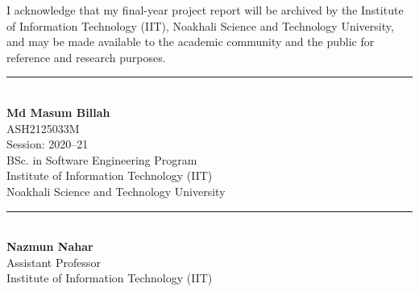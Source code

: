 I acknowledge that my final-year project report will be archived by the Institute of Information Technology (IIT), Noakhali Science and Technology University, and may be made available to the academic community and the public for reference and research purposes.
	
\vfil

\noindent
\begin{minipage}[t]{0.50\textwidth}
	\centering
	\rule{6cm}{0.4pt}\\[0.15cm]
	\textbf{Md Masum Billah}\\
	ASH2125033M\\
	Session: 2020--21\\
	BSc. in Software Engineering Program\\
	Institute of Information Technology (IIT)\\
	Noakhali Science and Technology University
\end{minipage}
\hfill
\begin{minipage}[t]{0.45\textwidth}
	\centering
	\rule{6cm}{0.4pt}\\[0.15cm]
	\textbf{Nazmun Nahar}\\
	Assistant Professor\\
	Institute of Information Technology (IIT)
\end{minipage}

\clearpage